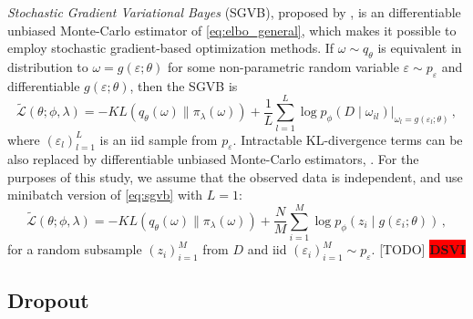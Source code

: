 \documentclass[a4paper,10pt]{article}
\newcommand{\important}[1]{\textbf{\colorbox{red}{#1}}}
\newcommand{\todo}[1]{{\color{blue} [TODO]} \important{#1}}
\begin{document}
\textit{Stochastic Gradient Variational Bayes} (SGVB), proposed by \cite{kingma_auto-encoding_2014},
is an differentiable unbiased Monte-Carlo estimator of \eqref{eq:elbo_general}, which makes
it possible to employ stochastic gradient-based optimization methods. If $
  \omega \sim q_{\theta}
$ is equivalent in distribution to $
  \omega = g(\varepsilon; \theta)
$ for some non-parametric random variable $
    \varepsilon \sim p_\varepsilon
$ and differentiable $
  g(\varepsilon; \theta)
$, then the SGVB is
\begin{equation} \label{eq:sgvb}
  \widetilde{\mathcal{L}}(\theta; \phi, \lambda)
    = - KL(q_{\theta}(\omega) \| \pi_{\lambda}(\omega))
      + \frac1{L} \sum_{l=1}^L
        \log p_{\phi}(D \mid \omega_{il})
          \Big\vert_{\omega_{l} = g(\varepsilon_{l}; \theta)}
    \,, 
\end{equation}
where $
  (\varepsilon_{l})_{l=1}^L
$ is an iid sample from $p_\varepsilon$. Intractable KL-divergence terms can be also
replaced by differentiable unbiased Monte-Carlo estimators, \cite{kingma_auto-encoding_2014}.
%
For the purposes of this study, we assume that the observed data is independent, and
use minibatch version of \eqref{eq:sgvb} with $L=1$:
\begin{equation} \label{eq:elbo}
  \widetilde{\mathcal{L}}(\theta; \phi, \lambda)
    = - KL(q_{\theta}(\omega) \| \pi_{\lambda}(\omega))
      + \frac{N}{M} \sum_{i=1}^M
        \log p_{\phi}(z_i \mid g(\varepsilon_i; \theta))
    \,,
\end{equation}
for a random subsample $(z_i)_{i=1}^M$ from $D$ and iid $
  (\varepsilon_i)_{i=1}^M \sim p_\varepsilon
$.
%
\todo{DSVI}

\subsection{Dropout} %
\label{sub:dropout}
\end{document}
